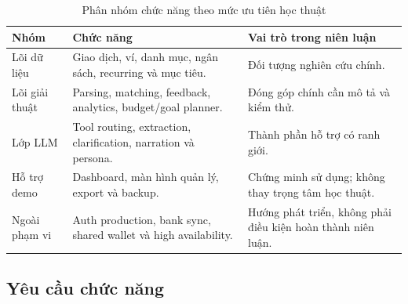 \begin{table}[H]
  \centering
  \caption{Phân nhóm chức năng theo mức ưu tiên học thuật}
  \label{tab:function-groups}
  \begin{tabularx}{\textwidth}{@{}L{3.4cm}Y Y@{}}
    \toprule
    \textbf{Nhóm} & \textbf{Chức năng} & \textbf{Vai trò trong niên luận} \\
    \midrule
    Lõi dữ liệu & Giao dịch, ví, danh mục, ngân sách, recurring và mục tiêu. & Đối tượng nghiên cứu chính. \\
    Lõi giải thuật & Parsing, matching, feedback, analytics, budget/goal planner. & Đóng góp chính cần mô tả và kiểm thử. \\
    Lớp LLM & Tool routing, extraction, clarification, narration và persona. & Thành phần hỗ trợ có ranh giới. \\
    Hỗ trợ demo & Dashboard, màn hình quản lý, export và backup. & Chứng minh sử dụng; không thay trọng tâm học thuật. \\
    Ngoài phạm vi & Auth production, bank sync, shared wallet và high availability. & Hướng phát triển, không phải điều kiện hoàn thành niên luận. \\
    \bottomrule
  \end{tabularx}
\end{table}

\subsection{Yêu cầu chức năng}

